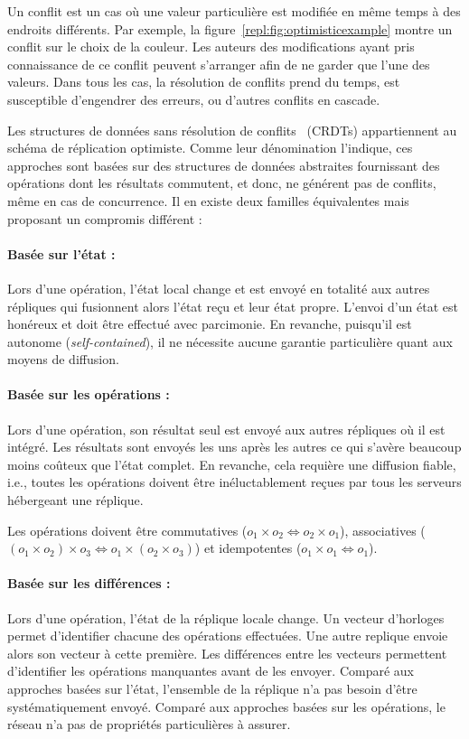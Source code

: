 Un conflit est un cas où une valeur particulière est modifiée en même temps à
des endroits différents. Par exemple, la figure~\ref{repl:fig:optimisticexample}
montre un conflit sur le choix de la couleur. Les auteurs des modifications
ayant pris connaissance de ce conflit peuvent s'arranger afin de ne garder que
l'une des valeurs. Dans tous les cas, la résolution de conflits prend du temps,
est susceptible d'engendrer des erreurs, ou d'autres conflits en cascade.

Les structures de données sans résolution de
conflits~\cite{shapiro2011comprehensive} (CRDTs) appartiennent au schéma de
réplication optimiste. Comme leur dénomination l'indique, ces approches sont
basées sur des structures de données abstraites fournissant des opérations dont
les résultats commutent, et donc, ne générent pas de conflits, même en cas de
concurrence.  Il en existe deux familles équivalentes mais proposant un
compromis différent :

\paragraph{Basée sur l'état :} Lors d'une opération, l'état local change et est
envoyé en totalité aux autres répliques qui fusionnent alors l'état reçu et leur
état propre. L'envoi d'un état est honéreux et doit être effectué avec
parcimonie. En revanche, puisqu'il est autonome (\emph{self-contained}), il ne
nécessite aucune garantie particulière quant aux moyens de diffusion.

\paragraph{Basée sur les opérations :} Lors d'une opération, son résultat seul
est envoyé aux autres répliques où il est intégré. Les résultats sont envoyés
les uns après les autres ce qui s'avère beaucoup moins coûteux que l'état
complet. En revanche, cela requière une diffusion fiable, i.e., toutes les
opérations doivent être inéluctablement reçues par tous les serveurs hébergeant
une réplique.

\noindent Les opérations doivent être commutatives
($o_1 \times o_2 \Leftrightarrow o_2 \times o_1$), associatives
($(o_1 \times o_2) \times o_3 \Leftrightarrow o_1 \times (o_2 \times o_3)$) et
idempotentes ($o_1 \times o_1 \Leftrightarrow o_1$).

\paragraph{Basée sur les différences :} Lors d'une opération, l'état de la
réplique locale change. Un vecteur d'horloges permet d'identifier chacune des
opérations effectuées. Une autre replique envoie alors son vecteur à cette
première. Les différences entre les vecteurs permettent d'identifier les
opérations manquantes avant de les envoyer. Comparé aux approches basées sur
l'état, l'ensemble de la réplique n'a pas besoin d'être systématiquement
envoyé. Comparé aux approches basées sur les opérations, le réseau n'a pas de
propriétés particulières à assurer.


